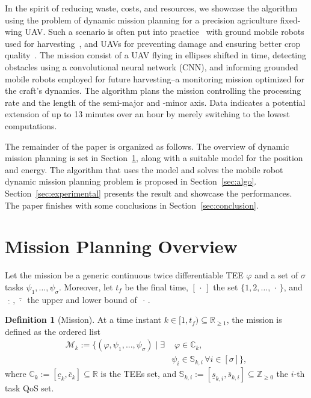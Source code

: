 \documentclass[letterpaper,10pt,conference]{ieeeconf}
\theoremstyle{definition}
\newtheorem{defn}{Definition}[section]
\begin{document}
In the spirit of reducing waste, costs, and resources, we showcase the algorithm using the problem of dynamic mission planning for a precision agriculture fixed-wing UAV. Such a scenario is often put into practice~\cite{hajjaj2014review} with ground mobile robots used for harvesting~\cite{qingchun2012study,dong2011development, de2011design, aljanobi2010setup, li2008analysis, edan2000robotic}, and UAVs for preventing damage and ensuring better crop quality~\cite{puri2017agriculture, daponte2019review}. The mission consist of a UAV flying in ellipses shifted in time, detecting obstacles using a convolutional neural network (CNN), and informing grounded mobile robots employed for future harvesting--a monitoring mission optimized for the craft's dynamics. The algorithm plans the mission controlling the processing rate and the length of the semi-major and -minor axis. Data indicates a potential extension of up to 13 minutes over an hour by merely switching to the lowest computations.

The remainder of the paper is organized as follows. The overview of dynamic mission planning is set in Section~\ref{sec:prob}, along with a suitable model for the position and energy. The algorithm that uses the model and solves the mobile robot dynamic mission planning problem is proposed in Section~\ref{sec:algo}. Section~\ref{sec:experimental} presents the result and showcase the performances. The paper finishes with some conclusions in Section~\ref{sec:conclusion}.


\section{Mission Planning Overview}
\label{sec:prob}

Let the mission be a generic continuous twice differentiable TEE $\varphi$ and a set of $\sigma$ tasks $\psi_1,\dots,\psi_{\sigma}$. Moreover, let $t_f$ be the final time, $[\,\cdot\,]$ the set $\{1,2,\dots,\,\cdot\,\}$, and $\underline{\,\cdot\,},\overline{\,\cdot\,}$ the upper and lower bound of $\,\cdot\,$.

\begin{defn}[Mission]\label{def:mission}
  At a time instant $k\in[1,t_f)\subseteq\mathbb{R}_{\geq 1}$, the mission is defined as the ordered list
  \begin{equation}\label{eq:mission}\begin{split}
    \mathcal{M}_k:=\{(\varphi,\psi_1,...,\psi_\sigma)\mid\exists&\,\,\varphi\in\mathbb{C}_k,\,\\&\psi_i\in\mathbb{S}_{k,i}\,\forall i\in[\sigma]\},
  \end{split}\end{equation}
  where $\mathbb{C}_k:=[\underline{c}_k,\overline{c}_k]\subseteq\mathbb{R}$ is the TEEs set, and $\mathbb{S}_{k,i}:=[\underline{s}_{k,i},\overline{s}_{k,i}]\subseteq\mathbb{Z}_{\geq 0}$ the $i$-th task QoS set.
\end{defn}
\end{document}
